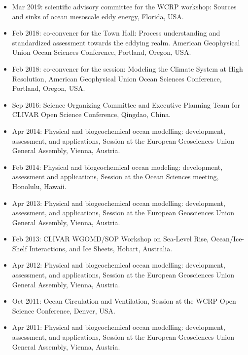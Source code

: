 \documentclass{article}
\begin{document}
\begin{itemize}[leftmargin=*]

\item Mar 2019: scientific advisory committee for the WCRP workshop: Sources and sinks of ocean mesoscale eddy energy, Florida, USA. 

\item Feb 2018: co-convener for the Town Hall: Process understanding and standardized assessment towards the eddying realm. {\sc American Geophysical Union Ocean Sciences Conference}, Portland, Oregon, USA.

\item Feb 2018: co-convener for the session: Modeling the Climate System at High Resolution, {\sc American Geophysical Union Ocean Sciences Conference}, Portland, Oregon, USA.

\item Sep 2016: Science Organizing Committee and Executive Planning
  Team for {\sc CLIVAR Open Science Conference}, Qingdao, China.

\item Apr 2014: {\sc Physical and biogeochemical ocean modelling: development, assessment, and applications}, Session at the European Geosciences Union General Assembly, Vienna, Austria.

\item Feb 2014: {\sc Physical and biogeochemical ocean modeling:
    development, assessment and applications}, Session at the Ocean
  Sciences meeting, Honolulu, Hawaii.

\item Apr 2013: {\sc Physical and biogeochemical ocean modelling:
  development, assessment, and applications}, Session at the European
Geosciences Union General Assembly, Vienna, Austria.

\item Feb 2013: {\sc CLIVAR WGOMD/SOP Workshop on Sea-Level Rise,
  Ocean/Ice-Shelf Interactions, and Ice Sheets}, Hobart, Australia.  

\item Apr 2012: {\sc Physical and biogeochemical ocean modelling:
  development, assessment, and applications}, Session at the European
Geosciences Union General Assembly, Vienna, Austria.

\item Oct 2011: {\sc Ocean Circulation and Ventilation}, Session at
the WCRP Open Science Conference, Denver, USA. 

\item Apr 2011: {\sc Physical and biogeochemical ocean modelling:
  development, assessment, and applications}, Session at the European
Geosciences Union General Assembly, Vienna, Austria.


\end{itemize}
\end{document}

